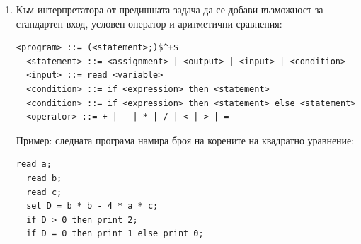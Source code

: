 \begin{enumerate}[resume]
\begin{flushleft}
\begin{lstlisting}[mathescape]
<program> ::= (<statement>;)$^+$
<statement> ::= <assignment> | <output>
<assignment> ::= set <variable> = <expression>
<output> ::= print <expression>
<variable> ::= a..z
<expression> ::= <variable> | <number> | <complex-expr>
<complex-exp> ::= <expression>(<operator> <expression>)$^*$ 
<complex-exp> ::=(<expression>(<operator> <expression>)$^+$)
<operator> ::= + | - | * | /
\end{lstlisting}
\end{flushleft}

Примерни програми на този език и съответния резултат на стандартния изход са:
\begin{lstlisting}[mathescape]
  print 10;
\end{lstlisting}
\emph{Изход:} 10

\begin{lstlisting}[mathescape]
  set x = 3*(1+2);
  print x + 10;
\end{lstlisting}
\emph{Изход:} 20

\begin{lstlisting}[mathescape]
  set x = 10;
  set y = 5*5;
  print x*y*2;
\end{lstlisting}
\emph{Изход:} 500

Да се напише интерпретатор за дадения език.

\item Към интерпретатора от предишната задача да се добави възможност за стандартен вход, условен оператор и аритметични сравнения:

\begin{flushleft}
  \begin{lstlisting}[mathescape]
  <program> ::= (<statement>;)$^+$
  <statement> ::= <assignment> | <output> | <input> | <condition>
  <input> ::= read <variable>
  <condition> ::= if <expression> then <statement>
  <condition> ::= if <expression> then <statement> else <statement>
  <operator> ::= + | - | * | / | < | > | =
\end{lstlisting}
\end{flushleft}

Пример: следната програма намира броя на корените на квадратно уравнение:
\begin{lstlisting}[mathescape]
  read a;
  read b;
  read c;
  set D = b * b - 4 * a * c;
  if D > 0 then print 2;
  if D = 0 then print 1 else print 0;
\end{lstlisting}

\end{enumerate}


